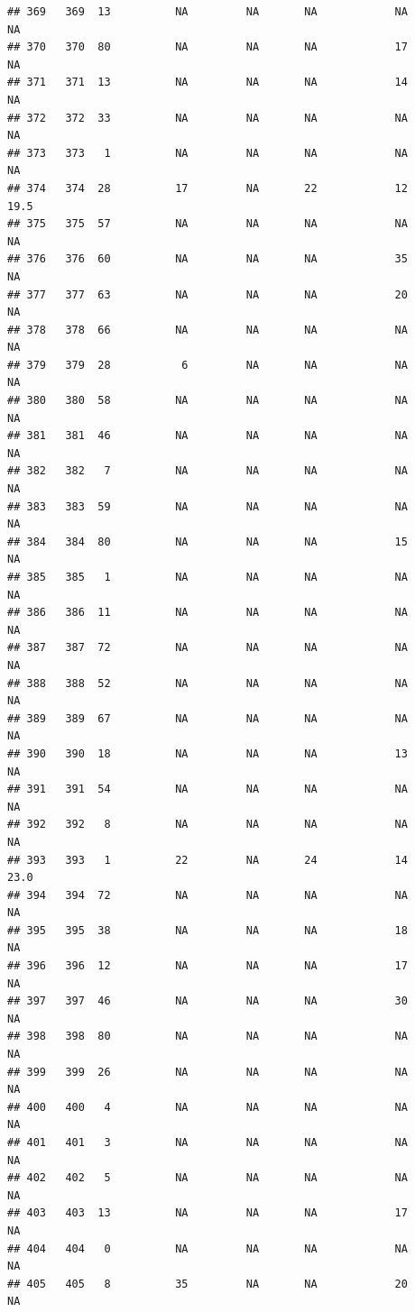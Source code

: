 \documentclass[man]{apa6}
\begin{document}
\begin{verbatim}
## 369   369  13          NA         NA       NA            NA       NA
## 370   370  80          NA         NA       NA            17       NA
## 371   371  13          NA         NA       NA            14       NA
## 372   372  33          NA         NA       NA            NA       NA
## 373   373   1          NA         NA       NA            NA       NA
## 374   374  28          17         NA       22            12     19.5
## 375   375  57          NA         NA       NA            NA       NA
## 376   376  60          NA         NA       NA            35       NA
## 377   377  63          NA         NA       NA            20       NA
## 378   378  66          NA         NA       NA            NA       NA
## 379   379  28           6         NA       NA            NA       NA
## 380   380  58          NA         NA       NA            NA       NA
## 381   381  46          NA         NA       NA            NA       NA
## 382   382   7          NA         NA       NA            NA       NA
## 383   383  59          NA         NA       NA            NA       NA
## 384   384  80          NA         NA       NA            15       NA
## 385   385   1          NA         NA       NA            NA       NA
## 386   386  11          NA         NA       NA            NA       NA
## 387   387  72          NA         NA       NA            NA       NA
## 388   388  52          NA         NA       NA            NA       NA
## 389   389  67          NA         NA       NA            NA       NA
## 390   390  18          NA         NA       NA            13       NA
## 391   391  54          NA         NA       NA            NA       NA
## 392   392   8          NA         NA       NA            NA       NA
## 393   393   1          22         NA       24            14     23.0
## 394   394  72          NA         NA       NA            NA       NA
## 395   395  38          NA         NA       NA            18       NA
## 396   396  12          NA         NA       NA            17       NA
## 397   397  46          NA         NA       NA            30       NA
## 398   398  80          NA         NA       NA            NA       NA
## 399   399  26          NA         NA       NA            NA       NA
## 400   400   4          NA         NA       NA            NA       NA
## 401   401   3          NA         NA       NA            NA       NA
## 402   402   5          NA         NA       NA            NA       NA
## 403   403  13          NA         NA       NA            17       NA
## 404   404   0          NA         NA       NA            NA       NA
## 405   405   8          35         NA       NA            20       NA

\end{verbatim}
\end{document}
